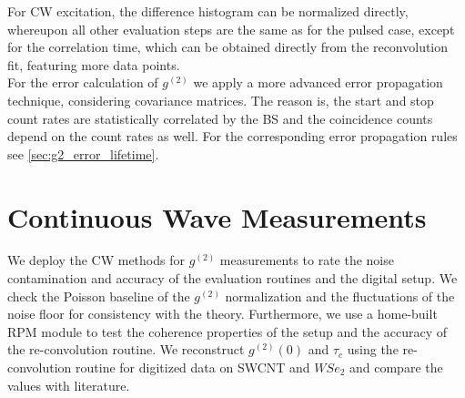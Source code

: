 For \ac{CW} excitation, the difference histogram can be normalized directly, whereupon all other evaluation steps are the same as for the pulsed case, except for the correlation time, which can be obtained directly from the reconvolution fit, featuring more data points.\\
For the error calculation of $g^{(2)}$ we apply a more advanced error propagation technique, considering covariance matrices. The reason is, the start and stop count rates are statistically correlated by the \ac{BS} and the coincidence counts depend on the count rates as well. For the corresponding error propagation rules see \cref{sec:g2_error_lifetime}. 

\section{Continuous Wave Measurements}
We deploy the \ac{CW} methods for $g^{(2)}$ measurements to rate the noise contamination and accuracy of the evaluation routines and the digital setup.
We check the Poisson baseline of the $g^{(2)}$ normalization and the fluctuations of the noise floor for consistency with the theory. Furthermore, we use a home-built \ac{RPM} module to test the coherence properties of the setup and the accuracy of the re-convolution routine.
We reconstruct $g^{(2)}(0)$ and $\tau_c$ using the re-convolution routine for digitized data on \ac{SWCNT} and $WSe_2$ and compare the values with literature.
